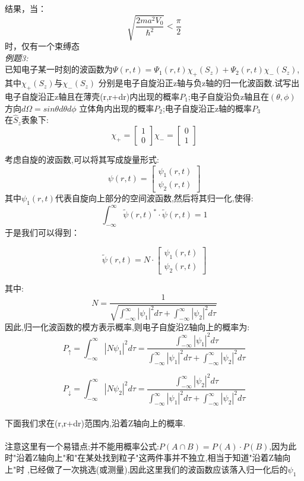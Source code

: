 \documentclass[UTF8]{ctexart}
\begin{document}
\newpage
结果，当：
\[
    \sqrt{\frac{2ma^2 V_0}{\hbar^2}} < \frac{\pi}{2}
\]
时，仅有一个束缚态\\


\emph{例题3:}\\
已知电子某一时刻的波函数为$\Psi(r,t)=\Psi_1(r,t)\chi_+(S_z)+\Psi_2(r,t)\chi_-(S_z)$,其中$\chi_+(S_z)$与$\chi_-(S_z)$
分别是电子自旋沿正z轴与负z轴的归一化波函数.试写出电子自旋沿正z轴且在薄壳(r,r+dr)内出现的概率$P_1$;电子自旋沿负z轴且在$(\theta,\phi)$方向$d\Omega=sin\theta d\theta d\phi$
立体角内出现的概率$P_2$;电子自旋沿正z轴的概率$P_3$\\

在$\hat{S}_z$表象下:
\[
    \chi_+=
    \begin{bmatrix}
        1\\
        0
    \end{bmatrix}
     \chi_-=
    \begin{bmatrix}
        0\\
        1
    \end{bmatrix}
\]

考虑自旋的波函数,可以将其写成旋量形式:
\[
    \psi(r,t)=
    \begin{bmatrix}
        \psi_1(r,t)\\
        \psi_2(r,t)
    \end{bmatrix}
\]
其中$\psi_1(r,t)$代表自旋向上部分的空间波函数,然后将其归一化,使得:\\

\[
    \int_{-\infty}^{\infty} \tilde{\psi}(r,t)^*\cdot \tilde{\psi}(r,t) = 1
\]
于是我们可以得到：

\[
    \tilde{\psi}(r,t) = N \cdot 
    \begin{bmatrix}
        \psi_1(r,t)\\
        \psi_2(r,t)
    \end{bmatrix}
\]

其中:
\[
    N = \frac{1}{\sqrt{  \int_{-\infty}^{\infty}|\psi_1|^2 d\tau + \int_{-\infty}^{\infty}|\psi_2|^2 d\tau}}
\]
因此,归一化波函数的模方表示概率,则电子自旋沿Z轴向上的概率为:
\[
    P_{\uparrow} =  \int_{-\infty}^{\infty}|N \psi_1|^2 d\tau = \frac{ \int_{-\infty}^{\infty}|\psi_1|^2 d\tau}{ \int_{-\infty}^{\infty}|\psi_1|^2 d\tau + \int_{-\infty}^{\infty}|\psi_2|^2 d\tau }
\]

\[
    P_{\downarrow} =  \int_{-\infty}^{\infty}|N \psi_2|^2 d\tau = \frac{ \int_{-\infty}^{\infty}|\psi_2|^2 d\tau}{ \int_{-\infty}^{\infty}|\psi_1|^2 d\tau + \int_{-\infty}^{\infty}|\psi_2|^2 d\tau }
\]
\\
下面我们求在(r,r+dr)范围内,沿着Z轴向上的概率.\\
\\
注意这里有一个易错点;并不能用概率公式:$P(A \cap B)=P(A)\cdot P(B)$,因为此时"沿着Z轴向上"和"在某处找到粒子"这两件事并不独立,相当于知道"沿着Z轴向上"时
,已经做了一次挑选(或测量),因此这里我们的波函数应该落入归一化后的$\psi_1$\\
\end{document}
